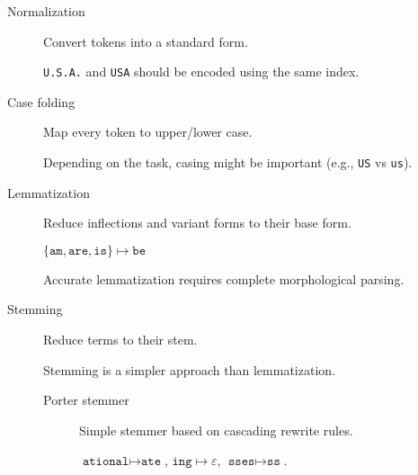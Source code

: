 \begin{description}
    \item[Normalization] 
        Convert tokens into a standard form.

        \begin{example}
            \texttt{U.S.A.} and \texttt{USA} should be encoded using the same index.
        \end{example}

    \item[Case folding] 
        Map every token to upper/lower case.

        \begin{remark}
            Depending on the task, casing might be important (e.g., \texttt{US} vs \texttt{us}).
        \end{remark}

    \item[Lemmatization] 
        Reduce inflections and variant forms to their base form.

        \begin{example}
            $\{ \texttt{am}, \texttt{are}, \texttt{is} \} \mapsto \texttt{be}$
        \end{example}

        \begin{remark}
            Accurate lemmatization requires complete morphological parsing.
        \end{remark}

    \item[Stemming] 
        Reduce terms to their stem.

        \begin{remark}
            Stemming is a simpler approach than lemmatization.
        \end{remark}

        \begin{description}
            \item[Porter stemmer]
                Simple stemmer based on cascading rewrite rules.

                \begin{example}
                    $\texttt{ational} \mapsto \texttt{ate}$, 
                    $\texttt{ing} \mapsto \varepsilon$,
                    $\texttt{sses} \mapsto \texttt{ss}$.
                \end{example}
        \end{description}
\end{description}



